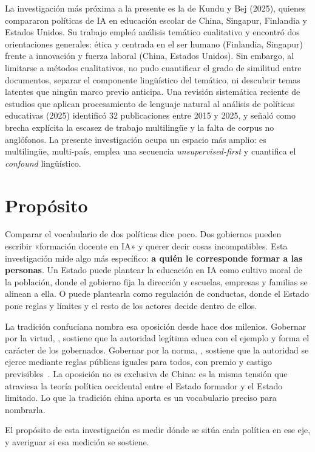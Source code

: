 La investigación más próxima a la presente es la de Kundu y Bej (2025), quienes compararon políticas de IA en educación escolar de China, Singapur, Finlandia y Estados Unidos. Su trabajo empleó análisis temático cualitativo y encontró dos orientaciones generales: ética y centrada en el ser humano (Finlandia, Singapur) frente a innovación y fuerza laboral (China, Estados Unidos). Sin embargo, al limitarse a métodos cualitativos, no pudo cuantificar el grado de similitud entre documentos, separar el componente lingüístico del temático, ni descubrir temas latentes que ningún marco previo anticipa. Una revisión sistemática reciente de estudios que aplican procesamiento de lenguaje natural al análisis de políticas educativas (2025) identificó 32 publicaciones entre 2015 y 2025, y señaló como brecha explícita la escasez de trabajo multilingüe y la falta de corpus no anglófonos. La presente investigación ocupa un espacio más amplio: es multilingüe, multi-país, emplea una secuencia \textit{unsupervised-first} y cuantifica el \textit{confound} lingüístico.


\section{Propósito}
\label{sec:proposito}

Comparar el vocabulario de dos políticas dice poco. Dos gobiernos pueden escribir «formación docente en IA» y querer decir cosas incompatibles. Esta investigación mide algo más específico: \textbf{a quién le corresponde formar a las personas}. Un Estado puede plantear la educación en IA como cultivo moral de la población, donde el gobierno fija la dirección y escuelas, empresas y familias se alinean a ella. O puede plantearla como regulación de conductas, donde el Estado pone reglas y límites y el resto de los actores decide dentro de ellos.

La tradición confuciana nombra esa oposición desde hace dos milenios. Gobernar por la virtud, \dezhi{}, sostiene que la autoridad legítima educa con el ejemplo y forma el carácter de los gobernados. Gobernar por la norma, \fa{}, sostiene que la autoridad se ejerce mediante reglas públicas iguales para todos, con premio y castigo previsibles~\citep{pines2023legalism}. La oposición no es exclusiva de China: es la misma tensión que atraviesa la teoría política occidental entre el Estado formador y el Estado limitado. Lo que la tradición china aporta es un vocabulario preciso para nombrarla.

El propósito de esta investigación es medir dónde se sitúa cada política en ese eje, y averiguar si esa medición se sostiene.


